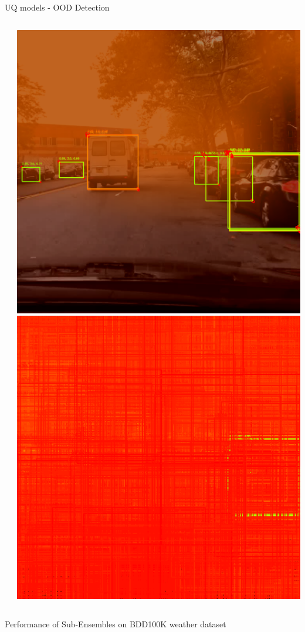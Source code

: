 \documentclass[10pt, aspectratio=169]{beamer}
\begin{document}
\begin{frame}[allowframebreaks]{UQ models - OOD Detection}
\begin{columns}
\begin{column}{.2\textwidth}
            \end{column}
            \begin{column}{.2\textwidth}
                \includegraphics[width=\textwidth]{images/uq_weathers/SubEns_Variance4.png}
                \includegraphics[width=\textwidth]{images/uq_weathers/SubEns_entropies_all4.png}
            \end{column}
        \end{columns}
        \begin{center}
            Performance of Sub-Ensembles on BDD100K weather dataset
        \end{center}
      


\end{frame}
\end{document}
